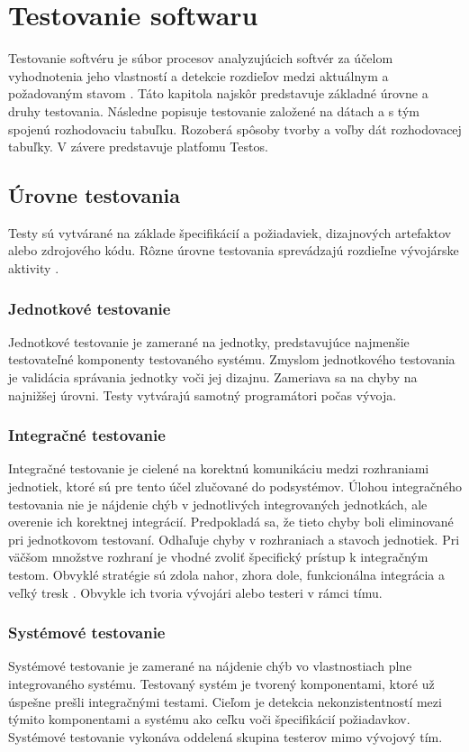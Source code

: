 \chapter{Testovanie softwaru}
\label{testing}
Testovanie softvéru je súbor procesov analyzujúcich softvér za účelom vyhodnotenia jeho vlastností a detekcie rozdieľov medzi aktuálnym a požadovaným stavom \cite{Standard}. Táto kapitola najskôr predstavuje základné úrovne a druhy testovania. Následne popisuje testovanie založené na dátach a s tým spojenú rozhodovaciu tabuľku. Rozoberá spôsoby tvorby a voľby dát rozhodovacej tabuľky. V závere predstavuje platfomu Testos.   

\bigskip
\section{Úrovne testovania}
Testy sú vytvárané na základe špecifikácií a požiadaviek, dizajnových artefaktov alebo zdrojového kódu. Rôzne úrovne testovania sprevádzajú rozdieľne vývojárske aktivity \cite{Ist}.
\subsection*{Jednotkové testovanie}
Jednotkové testovanie je zamerané na jednotky, predstavujúce najmenšie testovateľné komponenty testovaného systému. Zmyslom jednotkového testovania je validácia správania jednotky voči jej dizajnu. Zameriava sa na chyby na najnižšej úrovni. Testy vytvárajú samotný programátori počas vývoja.    
\subsection*{Integračné testovanie}
Integračné testovanie je cielené na korektnú komunikáciu medzi rozhraniami jednotiek, ktoré sú pre tento účel zlučované do podsystémov. Úlohou integračného testovania nie je nájdenie chýb v jednotlivých integrovaných jednotkách, ale overenie ich korektnej integrácií. Predpokladá sa, že tieto chyby boli eliminované pri jednotkovom testovaní. Odhaľuje chyby v rozhraniach a stavoch jednotiek. Pri väčšom množstve rozhraní je vhodné zvoliť špecifický prístup k integračným testom. Obvyklé stratégie sú zdola nahor, zhora dole, funkcionálna integrácia a veľký tresk \cite{Gst}. Obvykle ich tvoria vývojári alebo testeri v rámci tímu.
\subsection*{Systémové testovanie}
Systémové testovanie je zamerané na nájdenie chýb vo vlastnostiach plne integrovaného systému. Testovaný systém je tvorený komponentami, ktoré už úspešne prešli integračnými testami. Cieľom je detekcia nekonzistentností mezi týmito komponentami a systému ako ceľku voči špecifikácií požiadavkov. Systémové testovanie vykonáva oddelená skupina testerov mimo vývojový tím. 
